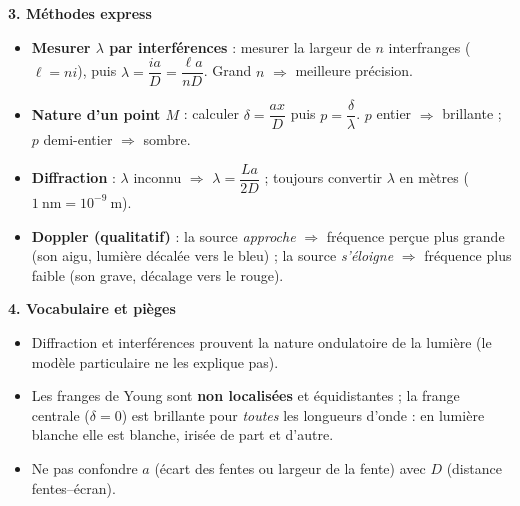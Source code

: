 \documentclass[11pt]{article}
\newcommand{\cle}[1]{{\popxbold\color{popdark}#1}}
\begin{document}
\begin{bilan}
\textbf{3. Méthodes express}
\begin{itemize}
  \item \textbf{Mesurer $\lambda$ par interférences} : mesurer la largeur de $n$ interfranges ($\ell = ni$), puis $\lambda = \dfrac{ia}{D} = \dfrac{\ell a}{nD}$. Grand $n$ $\Rightarrow$ meilleure précision.
  \item \textbf{Nature d'un point $M$} : calculer $\delta = \dfrac{ax}{D}$ puis $p = \dfrac{\delta}{\lambda}$. $p$ entier $\Rightarrow$ brillante ; $p$ demi-entier $\Rightarrow$ sombre.
  \item \textbf{Diffraction} : $\lambda$ inconnu $\Rightarrow$ $\lambda = \dfrac{La}{2D}$ ; toujours convertir $\lambda$ en mètres ($1\ \text{nm} = 10^{-9}\ \text{m}$).
  \item \textbf{Doppler (qualitatif)} : la source \emph{approche} $\Rightarrow$ fréquence perçue plus grande (son aigu, lumière décalée vers le bleu) ; la source \emph{s'éloigne} $\Rightarrow$ fréquence plus faible (son grave, décalage vers le rouge).
\end{itemize}

\textbf{4. Vocabulaire et pièges}
\begin{itemize}
  \item Diffraction et interférences prouvent la \cle{nature ondulatoire} de la lumière (le modèle particulaire ne les explique pas).
  \item Les franges de Young sont \textbf{non localisées} et équidistantes ; la frange centrale ($\delta = 0$) est brillante pour \emph{toutes} les longueurs d'onde : en lumière blanche elle est blanche, irisée de part et d'autre.
  \item Ne pas confondre $a$ (écart des fentes ou largeur de la fente) avec $D$ (distance fentes--écran).
\end{itemize}
\end{bilan}
\end{document}
